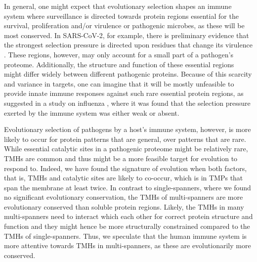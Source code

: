 \documentclass[utf8]{frontiersSCNS} %
\begin{document}
 
In general, one might expect that evolutionary selection shapes an immune system 
where surveillance is directed towards protein regions 
essential for the survival, proliferation and/or virulence or pathogenic microbes, 
as these will be most conserved.
In SARS-CoV-2, for example, there is preliminary evidence that the strongest
selection pressure is directed upon residues that change its 
virulence \citep{velazquez2020positive}.
These regions, however, may only account for a small part of a pathogen's proteome.
Additionally, the structure and function of these essential regions might differ widely between different pathogenic proteins.
Because of this scarcity and variance in targets, 
one can imagine that it will be mostly unfeasible 
to provide innate immune responses against such rare essential protein regions, 
as suggested in a study on influenza \citep{han2019individual},
where it was found that the selection pressure
exerted by the immune system was either weak or absent.
 

Evolutionary selection of pathogens by a host's immune system,
however, is more likely to occur for protein patterns that are general,
over patterns that are rare.
While essential catalytic sites in a pathogenic proteome
might be relatively rare, TMHs are common and thus might be a more feasible 
target for evolution to respond to.
Indeed, we have found the signature of evolution when both factors,
that is, TMHs and catalytic sites are likely to co-occur,
which is in TMPs that span the membrane at least twice.
In contrast to single-spanners, where we found no significant evolutionary conservation, 
the TMHs of multi-spanners are more evolutionary conserved than soluble protein regions. 
Likely, the TMHs in many multi-spanners need to interact which each other 
for correct protein structure and function 
and they might hence be more structurally constrained 
compared to the TMHs of single-spanners.
Thus, we speculate that the human immune system is more attentive 
towards TMHs in multi-spanners, as these are evolutionarily more conserved. 
\end{document}
